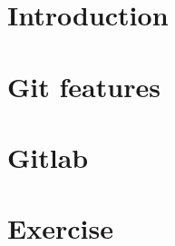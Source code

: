 \documentclass{beamer}
\begin{document}

 


\section{Introduction}



\section{Git features}



\section{Gitlab}



\section{Exercise}


\end{document}
